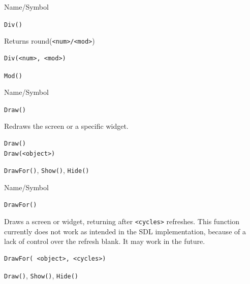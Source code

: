 \begin{desc}{Name/Symbol}
\item[Name/Symbol]	\verb+Div()+

\item[Description]  	Returns round(\verb+<num>/<mod>+)

\item[Usage]
\begin{verbatim}
Div(<num>, <mod>)
\end{verbatim}

\item[Example]	

\item[See Also]	\verb+Mod()+
\end{desc}






\begin{desc}{Name/Symbol}
\item[Name/Symbol]	\verb+Draw()+

\item[Description]	Redraws the screen or a specific widget.

\item[Usage]
\begin{verbatim}
Draw()
Draw(<object>)
\end{verbatim}

\item[Example]	

\item[See Also]	\verb+DrawFor()+, \verb+Show()+, \verb+Hide()+
\end{desc}





\begin{desc}{Name/Symbol}
\item[Name/Symbol]	\verb+DrawFor()+

\item[Description] Draws a screen or widget, returning after
  \verb+<cycles>+ refreshes. This function currently does not work as
  intended in the SDL implementation, because of a lack of control
  over the refresh blank.  It may work in the future.

\item[Usage]
\begin{verbatim}
DrawFor( <object>, <cycles>)
\end{verbatim}

\item[Example]	

\item[See Also]	\verb+Draw()+, \verb+Show()+, \verb+Hide()+
\end{desc}



